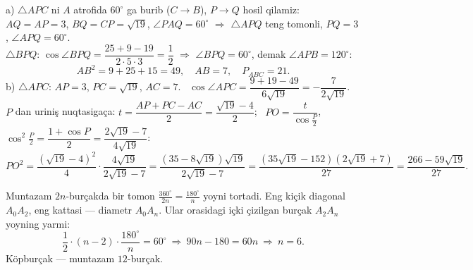 \newpage
{}
a) $\triangle APC$ ni $A$ atrofida $60^\circ$ ga burib ($C\to B$), $P\to Q$ hosil qilamiz: $AQ=AP=3$, $BQ=CP=\sqrt{19}$, $\angle PAQ=60^\circ$ $\Rightarrow$ $\triangle APQ$ teng tomonli, $PQ=3$, $\angle APQ=60^\circ$.\\
$\triangle BPQ$: $\cos\angle BPQ=\dfrac{25+9-19}{2\cdot5\cdot3}=\dfrac12$ $\Rightarrow$ $\angle BPQ=60^\circ$, demak $\angle APB=120^\circ$:
\[AB^2=9+25+15=49,\quad AB=7,\quad P_{ABC}=21.\]
b) $\triangle APC$: $AP=3$, $PC=\sqrt{19}$, $AC=7$. \ $\cos\angle APC=\dfrac{9+19-49}{6\sqrt{19}}=-\dfrac7{2\sqrt{19}}$.\\
$P$ dan uriniş nuqtasigaça: $t=\dfrac{AP+PC-AC}2=\dfrac{\sqrt{19}-4}2$; \ $PO=\dfrac t{\cos\frac P2}$, \ $\cos^2\frac P2=\dfrac{1+\cos P}2=\dfrac{2\sqrt{19}-7}{4\sqrt{19}}$:
\[PO^2=\frac{(\sqrt{19}-4)^2}{4}\cdot\frac{4\sqrt{19}}{2\sqrt{19}-7}=\frac{(35-8\sqrt{19})\sqrt{19}}{2\sqrt{19}-7}=\frac{(35\sqrt{19}-152)(2\sqrt{19}+7)}{27}=\frac{266-59\sqrt{19}}{27}.\]

\newpage
{}
Muntazam $2n$-burçakda bir tomon $\frac{360^\circ}{2n}=\frac{180^\circ}n$ yoyni tortadi. Eng kiçik diagonal $A_0A_2$, eng kattasi — diametr $A_0A_n$. Ular orasidagi içki çizilgan burçak $A_2A_n$ yoyning yarmi:
\[\frac12\cdot(n-2)\cdot\frac{180^\circ}n=60^\circ\ \Rightarrow\ 90n-180=60n\ \Rightarrow\ n=6.\]
Köpburçak — muntazam $12$-burçak.

